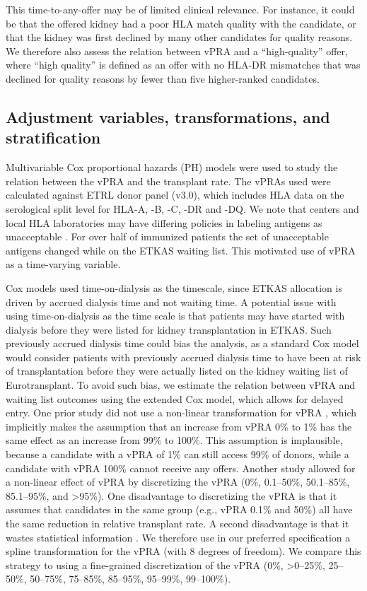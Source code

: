 \documentclass[11pt,twoside,]{book}
\begin{document}
This time-to-any-offer may be of limited clinical relevance. For instance,
it could be that the offered kidney had a poor HLA match quality with the
candidate, or that the kidney was first declined by many other candidates for
quality reasons. We therefore also assess the relation between vPRA and a
``high-quality'' offer, where ``high quality'' is defined as an offer with no HLA-DR
mismatches that was declined for quality reasons by fewer than five higher-ranked
candidates.

\subsection{Adjustment variables, transformations, and stratification}\label{adjustment-variables-transformations-and-stratification}

Multivariable Cox proportional hazards (PH) models were used to study
the relation between the vPRA and the transplant rate. The vPRAs used
were calculated against ETRL donor panel (v3.0), which includes HLA data on the
serological split level for HLA-A, -B, -C, -DR and -DQ. We note that centers and
local HLA laboratories may have differing policies in labeling antigens as
unacceptable \citep{ziemannUnacceptableHumanLeucocyte2017}. For over
half of immunized patients the set of unacceptable antigens changed
while on the ETKAS waiting list. This motivated use of vPRA as a
time-varying variable.

Cox models used time-on-dialysis as the timescale, since ETKAS
allocation is driven by accrued dialysis time and not waiting time.
A potential issue with using time-on-dialysis as the time
scale is that patients may have started with dialysis before they
were listed for kidney transplantation in ETKAS. Such previously accrued dialysis time could bias the analysis,
as a standard Cox model would consider patients with previously accrued
dialysis time to have been at risk of transplantation before they were
actually listed on the kidney waiting list of Eurotransplant. To avoid such bias, we estimate the
relation between vPRA and waiting list outcomes using the extended Cox model,
which allows for delayed entry.
\newpage
One prior study did not use a non-linear transformation for vPRA \citep{ziemannUnacceptableHumanLeucocyte2017},
which implicitly makes the assumption that an increase from vPRA 0\% to 1\% has
the same effect as an increase from 99\% to 100\%. This assumption is implausible,
because a candidate with a vPRA of 1\% can still access 99\% of donors, while a
candidate with vPRA 100\% cannot receive any offers. Another study allowed for
a non-linear effect of vPRA by discretizing the vPRA (0\%, 0.1--50\%, 50.1--85\%,
85.1--95\%, and \textgreater95\%). One disadvantage to discretizing the vPRA is that it
assumes that candidates in the same group (e.g., vPRA 0.1\% and 50\%) all have the same
reduction in relative transplant rate. A second disadvantage is that it wastes
statistical information \citep{altmanRoyston2006}.
We therefore use in our preferred
specification a spline transformation for the vPRA (with 8 degrees of
freedom). We compare this strategy to using a
fine-grained discretization of the vPRA (0\%, \textgreater0--25\%, 25--50\%, 50--75\%,
75--85\%, 85--95\%, 95--99\%, 99--100\%).
\end{document}
